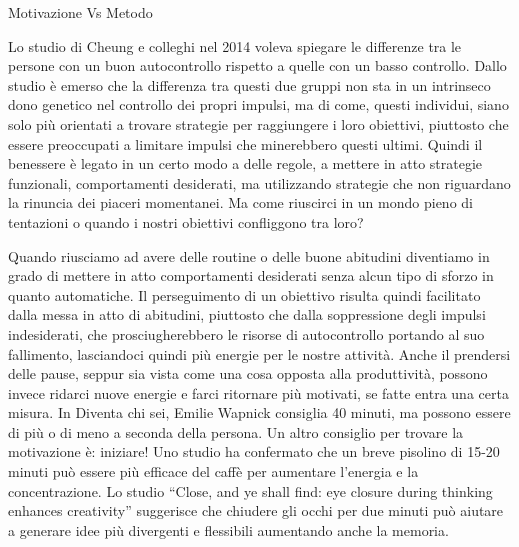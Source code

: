 \documentclass[12pt]{book} %
\begin{document}
\begin{mdframed}[linewidth=1pt]
Motivazione Vs Metodo

Lo studio di Cheung e colleghi nel 2014 voleva spiegare le differenze tra le persone con un buon autocontrollo rispetto
a quelle con un basso controllo. Dallo studio è emerso che la differenza tra questi due gruppi non sta in un intrinseco
dono genetico nel controllo dei propri impulsi, ma di come, questi individui, siano solo più orientati a trovare
strategie per raggiungere i loro obiettivi, piuttosto che essere preoccupati a limitare impulsi che minerebbero questi
ultimi. Quindi il benessere è legato in un certo modo a delle regole, a mettere in atto strategie funzionali,
comportamenti desiderati, ma utilizzando strategie che non riguardano la rinuncia dei piaceri momentanei. Ma come
riuscirci in un mondo pieno di tentazioni o quando i nostri obiettivi confliggono tra loro? 

Quando riusciamo ad avere delle routine o delle buone abitudini diventiamo in grado di mettere in atto comportamenti
desiderati senza alcun tipo di sforzo in quanto automatiche. Il perseguimento di un obiettivo risulta quindi facilitato
dalla messa in atto di abitudini, piuttosto che dalla soppressione degli impulsi indesiderati, che prosciugherebbero le
risorse di autocontrollo portando al suo fallimento, lasciandoci quindi più energie per le nostre
attività. Anche il prendersi delle pause, seppur
sia vista come una cosa opposta alla produttività, possono invece ridarci nuove energie e farci ritornare più motivati,
se fatte entra una certa misura. In Diventa chi sei, Emilie Wapnick
consiglia 40 minuti, ma possono essere di più o di meno a seconda della persona. Un altro consiglio per trovare la
motivazione è: iniziare!
Uno studio ha confermato che un breve pisolino di 15-20 minuti può essere più efficace del caffè per aumentare l’energia e la concentrazione.
Lo studio “Close, and ye shall find: eye closure during thinking enhances creativity” suggerisce che chiudere gli occhi per due minuti può aiutare a generare idee più divergenti e flessibili aumentando anche la memoria.


\end{mdframed}
\end{document}
